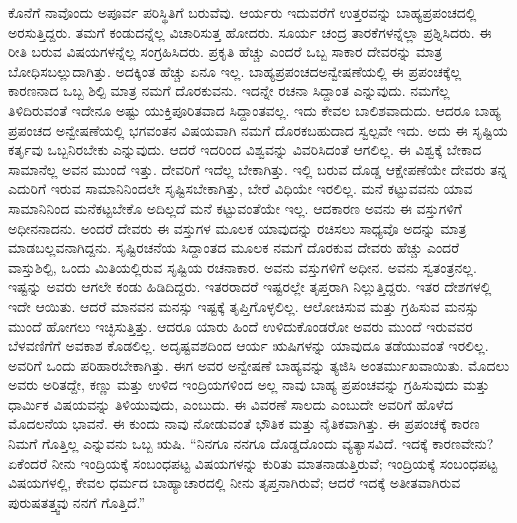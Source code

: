ಕೊನೆಗೆ ನಾವೊಂದು ಅಪೂರ್ವ ಪರಿಸ್ಥಿತಿಗೆ ಬರುವೆವು. ಆರ್ಯರು ಇದುವರೆಗೆ ಉತ್ತರವನ್ನು ಬಾಹ್ಯಪ್ರಪಂಚದಲ್ಲಿ ಅರಸುತ್ತಿದ್ದರು. ತಮಗೆ ಕಂಡುದನ್ನೆಲ್ಲ ವಿಚಾರಿಸುತ್ತ ಹೋದರು. ಸೂರ್ಯ ಚಂದ್ರ ತಾರಕೆಗಳನ್ನೆಲ್ಲಾ ಪ್ರಶ್ನಿಸಿದರು. ಈ ರೀತಿ ಬರುವ ವಿಷಯಗಳನ್ನೆಲ್ಲ ಸಂಗ್ರಹಿಸಿದರು. ಪ್ರಕೃತಿ ಹೆಚ್ಚು ಎಂದರೆ ಒಬ್ಬ ಸಾಕಾರ ದೇವರನ್ನು ಮಾತ್ರ ಬೋಧಿಸಬಲ್ಲುದಾಗಿತ್ತು. ಅದಕ್ಕಿಂತ ಹೆಚ್ಚು ಏನೂ ಇಲ್ಲ. ಬಾಹ್ಯಪ್ರಪಂಚದ\break ಅನ್ವೇಷಣೆಯಲ್ಲಿ ಈ ಪ್ರಪಂಚಕ್ಕೆಲ್ಲ ಕಾರಣನಾದ ಒಬ್ಬ ಶಿಲ್ಪಿ ಮಾತ್ರ ನಮಗೆ ದೊರಕುವನು. ಇದನ್ನೇ ರಚನಾ ಸಿದ್ದಾಂತ ಎನ್ನುವುದು. ನಮಗೆಲ್ಲ ತಿಳಿದಿರುವಂತೆ ಇದೇನೂ ಅಷ್ಟು ಯುಕ್ತಿಪೂರಿತವಾದ ಸಿದ್ದಾಂತವಲ್ಲ. ಇದು ಕೇವಲ ಬಾಲಿಶವಾದುದು. ಆದರೂ ಬಾಹ್ಯ ಪ್ರಪಂಚದ ಅನ್ವೇಷಣೆಯಲ್ಲಿ ಭಗವಂತನ ವಿಷಯವಾಗಿ ನಮಗೆ ದೊರಕಬಹುದಾದ ಸ್ವಲ್ಪವೇ ಇದು. ಅದು ಈ ಸೃಷ್ಟಿಯ ಕರ್ತೃವು ಒಬ್ಬನಿರಬೇಕು ಎನ್ನುವುದು. ಆದರೆ ಇದರಿಂದ ವಿಶ್ವವನ್ನು ವಿವರಿಸಿದಂತೆ ಆಗಲಿಲ್ಲ. ಈ ವಿಶ್ವಕ್ಕೆ ಬೇಕಾದ ಸಾಮಾನೆಲ್ಲ ಅವನ ಮುಂದೆ ಇತ್ತು. ದೇವರಿಗೆ ಇದೆಲ್ಲ ಬೇಕಾಗಿತ್ತು. ಇಲ್ಲಿ ಬರುವ ದೊಡ್ಡ ಆಕ್ಷೇಪಣೆಯೇ ದೇವರು ತನ್ನ ಎದುರಿಗೆ ಇರುವ ಸಾಮಾನಿನಿಂದಲೇ ಸೃಷ್ಟಿಸಬೇಕಾಗಿತ್ತು, ಬೇರೆ ವಿಧಿಯೇ ಇರಲಿಲ್ಲ. ಮನೆ ಕಟ್ಟುವವನು ಯಾವ ಸಾಮಾನಿನಿಂದ ಮನೆಕಟ್ಟಬೇಕೊ ಅದಿಲ್ಲದೆ ಮನೆ ಕಟ್ಟುವಂತೆಯೇ ಇಲ್ಲ. ಆದಕಾರಣ ಅವನು ಈ ವಸ್ತುಗಳಿಗೆ ಅಧೀನನಾದನು. ಅಂದರೆ ದೇವರು ಈ ವಸ್ತುಗಳ ಮೂಲಕ ಯಾವುದನ್ನು ರಚಿಸಲು ಸಾಧ್ಯವೊ ಅದನ್ನು ಮಾತ್ರ ಮಾಡಬಲ್ಲವನಾಗಿದ್ದನು. ಸೃಷ್ಟಿರಚನೆಯ ಸಿದ್ದಾಂತದ ಮೂಲಕ ನಮಗೆ ದೊರಕುವ ದೇವರು ಹೆಚ್ಚು ಎಂದರೆ ವಾಸ್ತುಶಿಲ್ಪಿ, ಒಂದು ಮಿತಿಯಲ್ಲಿರುವ ಸೃಷ್ಟಿಯ ರಚನಾಕಾರ. ಅವನು ವಸ್ತುಗಳಿಗೆ ಅಧೀನ. ಅವನು ಸ್ವತಂತ್ರನಲ್ಲ. ಇಷ್ಟನ್ನು ಅವರು ಆಗಲೇ ಕಂಡು ಹಿಡಿದಿದ್ದರು. ಇತರರಾದರೆ ಇಷ್ಟರಲ್ಲೇ ತೃಪ್ತರಾಗಿ ನಿಲ್ಲುತ್ತಿದ್ದರು. ಇತರ ದೇಶಗಳಲ್ಲಿ ಇದೇ ಆಯಿತು. ಆದರೆ ಮಾನವನ ಮನಸ್ಸು ಇಷ್ಟಕ್ಕೆ ತೃಪ್ತಿಗೊಳ್ಳಲಿಲ್ಲ. ಆಲೋಚಿಸುವ ಮತ್ತು ಗ್ರಹಿಸುವ ಮನಸ್ಸು ಮುಂದೆ ಹೋಗಲು ಇಚ್ಛಿಸುತ್ತಿತ್ತು. ಆದರೂ ಯಾರು ಹಿಂದೆ ಉಳಿದುಕೊಂಡರೋ ಅವರು ಮುಂದೆ ಇರುವವರ ಬೆಳವಣಿಗೆಗೆ ಅವಕಾಶ ಕೊಡಲಿಲ್ಲ. ಅದೃಷ್ಟವಶದಿಂದ ಆರ್ಯ ಋಷಿಗಳನ್ನು ಯಾವುದೂ ತಡೆಯುವಂತೆ ಇರಲಿಲ್ಲ. ಅವರಿಗೆ ಒಂದು ಪರಿಹಾರಬೇಕಾಗಿತ್ತು. ಈಗ ಅವರ ಅನ್ವೇಷಣೆ ಬಾಹ್ಯವನ್ನು ತ್ಯಜಿಸಿ ಅಂತರ್ಮುಖವಾಯಿತು. ಮೊದಲು ಅವರು ಅರಿತದ್ದೇ, ಕಣ್ಣು ಮತ್ತು ಉಳಿದ ಇಂದ್ರಿಯಗಳಿಂದ ಅಲ್ಲ ನಾವು ಬಾಹ್ಯ ಪ್ರಪಂಚವನ್ನು ಗ್ರಹಿಸುವುದು ಮತ್ತು ಧಾರ್ಮಿಕ ವಿಷಯವನ್ನು ತಿಳಿಯುವುದು, ಎಂಬುದು. ಈ ವಿವರಣೆ ಸಾಲದು ಎಂಬುದೇ ಅವರಿಗೆ ಹೊಳೆದ ಮೊದಲನೆಯ ಭಾವನೆ. ಈ ಕುಂದು ನಾವು ನೋಡುವಂತೆ ಭೌತಿಕ ಮತ್ತು ನೈತಿಕವಾಗಿತ್ತು. ಈ ಪ್ರಪಂಚಕ್ಕೆ ಕಾರಣ ನಿಮಗೆ ಗೊತ್ತಿಲ್ಲ ಎನ್ನುವನು ಒಬ್ಬ ಋಷಿ. “ನಿನಗೂ ನನಗೂ ದೊಡ್ಡದೊಂದು ವ್ಯತ್ಯಾಸವಿದೆ. ಇದಕ್ಕೆ ಕಾರಣವೇನು? ಏಕೆಂದರೆ ನೀನು ಇಂದ್ರಿಯಕ್ಕೆ ಸಂಬಂಧಪಟ್ಟ ವಿಷಯಗಳನ್ನು ಕುರಿತು ಮಾತನಾಡುತ್ತಿರುವೆ; ಇಂದ್ರಿಯಕ್ಕೆ ಸಂಬಂಧಪಟ್ಟ ವಿಷಯಗಳಲ್ಲಿ, ಕೇವಲ ಧರ್ಮದ ಬಾಹ್ಯಾಚಾರದಲ್ಲಿ ನೀನು ತೃಪ್ತನಾಗಿರುವೆ; ಆದರೆ ಇದಕ್ಕೆ ಅತೀತವಾಗಿರುವ ಪುರುಷತತ್ತ್ವವು ನನಗೆ ಗೊತ್ತಿದೆ.”

